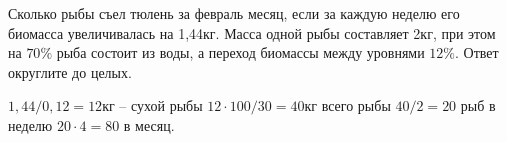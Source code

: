 
Сколько рыбы съел тюлень за февраль месяц, если за каждую неделю его
биомасса увеличивалась на 1,44кг.  Масса
одной рыбы составляет 2кг, при этом на $70\%$ рыба состоит из воды, а переход
биомассы между уровнями $12\%$. Ответ округлите до целых.

\solutionSection

$1,44/0,12=12$кг – сухой рыбы $12 \cdot 100/30=40$кг всего рыбы $40/2=20$ рыб в неделю $20 \cdot 4 = 80$ в месяц.

